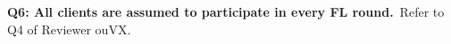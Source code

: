 \documentclass[10pt,twocolumn,letterpaper]{article}
\begin{document}
\noindent\textbf{Q6: All clients are assumed to participate in every FL round.}~Refer to Q4 of Reviewer ouVX. 

{
    \small
    
    
}
\end{document}
